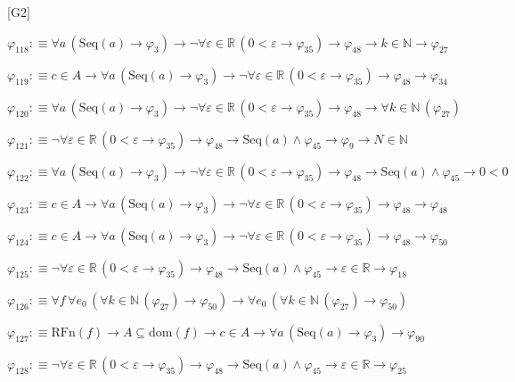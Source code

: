 \begin{fullproof}{[G2]}
\begin{abbrevlist}
\item $\varphi_{118} :\equiv \forall a\,(\mathrm{Seq}(a) \to \varphi_{3}) \to \neg \forall \varepsilon \in \mathbb{R}\,(0 < \varepsilon \to \varphi_{35}) \to \varphi_{48} \to k \in \mathbb{N} \to \varphi_{27}$
\item $\varphi_{119} :\equiv c \in A \to \forall a\,(\mathrm{Seq}(a) \to \varphi_{3}) \to \neg \forall \varepsilon \in \mathbb{R}\,(0 < \varepsilon \to \varphi_{35}) \to \varphi_{48} \to \varphi_{34}$
\item $\varphi_{120} :\equiv \forall a\,(\mathrm{Seq}(a) \to \varphi_{3}) \to \neg \forall \varepsilon \in \mathbb{R}\,(0 < \varepsilon \to \varphi_{35}) \to \varphi_{48} \to \forall k \in \mathbb{N}\,(\varphi_{27})$
\item $\varphi_{121} :\equiv \neg \forall \varepsilon \in \mathbb{R}\,(0 < \varepsilon \to \varphi_{35}) \to \varphi_{48} \to \mathrm{Seq}(a) \land \varphi_{45} \to \varphi_{9} \to N \in \mathbb{N}$
\item $\varphi_{122} :\equiv \forall a\,(\mathrm{Seq}(a) \to \varphi_{3}) \to \neg \forall \varepsilon \in \mathbb{R}\,(0 < \varepsilon \to \varphi_{35}) \to \varphi_{48} \to \mathrm{Seq}(a) \land \varphi_{45} \to 0 < 0$
\item $\varphi_{123} :\equiv c \in A \to \forall a\,(\mathrm{Seq}(a) \to \varphi_{3}) \to \neg \forall \varepsilon \in \mathbb{R}\,(0 < \varepsilon \to \varphi_{35}) \to \varphi_{48} \to \varphi_{48}$
\item $\varphi_{124} :\equiv c \in A \to \forall a\,(\mathrm{Seq}(a) \to \varphi_{3}) \to \neg \forall \varepsilon \in \mathbb{R}\,(0 < \varepsilon \to \varphi_{35}) \to \varphi_{48} \to \varphi_{50}$
\item $\varphi_{125} :\equiv \neg \forall \varepsilon \in \mathbb{R}\,(0 < \varepsilon \to \varphi_{35}) \to \varphi_{48} \to \mathrm{Seq}(a) \land \varphi_{45} \to \varepsilon \in \mathbb{R} \to \varphi_{18}$
\item $\varphi_{126} :\equiv \forall f\,\forall e_{0}\,(\forall k \in \mathbb{N}\,(\varphi_{27}) \to \varphi_{50}) \to \forall e_{0}\,(\forall k \in \mathbb{N}\,(\varphi_{27}) \to \varphi_{50})$
\item $\varphi_{127} :\equiv \mathrm{RFn}(f) \to A \subseteq \mathrm{dom}(f) \to c \in A \to \forall a\,(\mathrm{Seq}(a) \to \varphi_{3}) \to \varphi_{90}$
\item $\varphi_{128} :\equiv \neg \forall \varepsilon \in \mathbb{R}\,(0 < \varepsilon \to \varphi_{35}) \to \varphi_{48} \to \mathrm{Seq}(a) \land \varphi_{45} \to \varepsilon \in \mathbb{R} \to \varphi_{25}$

\end{abbrevlist}
\end{fullproof}

